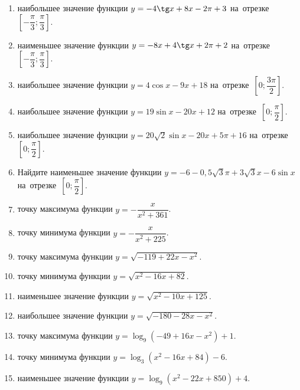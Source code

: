 \documentclass[a4paper,10pt]{article}
\begin{document}
\begin{enumerate}
\item {} наибольшее значение функции $y=-4\tg x +8x-2\pi +3$ на~отрезке~$\left[-\dfrac{\pi}{3};\dfrac{\pi}{3}\right]$.

\item {} наименьшее значение функции $y=-8x +4\tg x+2\pi+2$ на~отрезке~$\left[-\dfrac{\pi}{3};\dfrac{\pi}{3}\right]$.

\item {} наибольшее значение функции $y=4\cos x-9x+18$ на~отрезке~$\left[0;\dfrac{3\pi}{2}\right]$.

\item {} наибольшее значение функции $y=19\sin x-20x+12$ на~отрезке~$\left[0;\dfrac{\pi}{2}\right]$.

\item {} наибольшее значение функции $y=20\sqrt{2}\sin x-20x+5\pi +16$ на~отрезке~$\left[0;\dfrac{\pi}{2}\right]$.

\item Найдите наименьшее значение функции $y=-6-0,5\sqrt{3}\pi+3\sqrt{3}x-6\sin x$ на~отрезке~$\left[0;\dfrac{\pi}{2}\right]$.

\item {} точку максимума функции $y=-\dfrac{x}{ x^2 +361}$.

\item {} точку минимума функции $y=-\dfrac{x}{ x^2 +225}$.

\item {} точку максимума функции $y=\sqrt{-119+22x-x^2}$.

\item {} точку минимума функции $y=\sqrt{x^2-16x+82}$.

\item {} наименьшее значение функции $y=\sqrt{x^2-10x+125}$.

\item {} наибольшее значение функции $y=\sqrt{-180-28x-x^2}$.

\item {} точку максимума функции $y=\log_9\left(-49+16x-x^2\right)+1$.

\item {} точку минимума функции $y=\log_3\left(x^2-16x+84\right)-6$.

\item {} наименьшее значение функции $y=\log_9\left(x^2-22x+850\right)+4$.


\end{enumerate}
\end{document}
